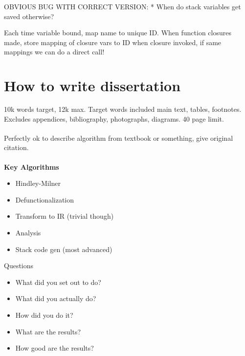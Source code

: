 \documentclass{report}
\begin{document}
OBVIOUS BUG WITH CORRECT VERSION:
* When do stack variables get saved otherwise?

Each time variable bound, map name to unique ID.
When function closures made, store mapping of closure vars to ID
when closure invoked, if same mappings we can do a direct call!

\section*{How to write dissertation}
10k words target, 12k max. Target words included main text, tables, footnotes. Excludes appendices, bibliography, photographs, diagrams.
40 page limit.
\\\\
Perfectly ok to describe algorithm from textbook or something, give original citation.
\\\\
\textbf{Key Algorithms}
\begin{itemize}
	\item Hindley-Milner
	\item Defunctionalization
	\item Transform to IR (trivial though)
	\item Analysis
	\item Stack code gen (most advanced)
\end{itemize}

Questions
\begin{itemize}
	\item What did you set out to do?
	\item What did you actually do?
	\item How did you do it?
	\item What are the results?
	\item How good are the results?	
\end{itemize}
\end{document}
